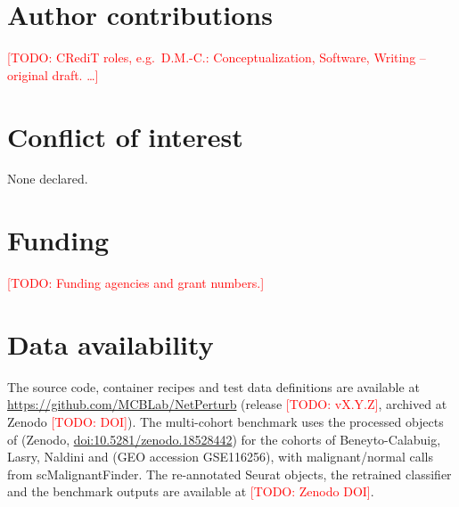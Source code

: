 \documentclass[unnumsec,webpdf,contemporary,large]{oup-authoring-template}
\newcommand{\todo}[1]{\textcolor{red}{[TODO: #1]}}
\begin{document}
\section{Author contributions}
\todo{CRediT roles, e.g.\ D.M.-C.: Conceptualization, Software, Writing -- original draft. \ldots}

\section{Conflict of interest}
None declared.

\section{Funding}
\todo{Funding agencies and grant numbers.}

\section{Data availability}
The source code, container recipes and test data definitions are available at \url{https://github.com/MCBLab/NetPerturb} (release \todo{vX.Y.Z}, archived at Zenodo \todo{DOI}). The multi-cohort benchmark uses the processed objects of \citet{Zeng2025bonemarrowmap} (Zenodo, \href{https://doi.org/10.5281/zenodo.18528442}{doi:10.5281/zenodo.18528442}) for the cohorts of Beneyto-Calabuig, Lasry, Naldini and \citet{vanGalen2019aml} (GEO accession GSE116256), with malignant/normal calls from scMalignantFinder. The re-annotated Seurat objects, the retrained classifier and the benchmark outputs are available at \todo{Zenodo DOI}.



\end{document}
